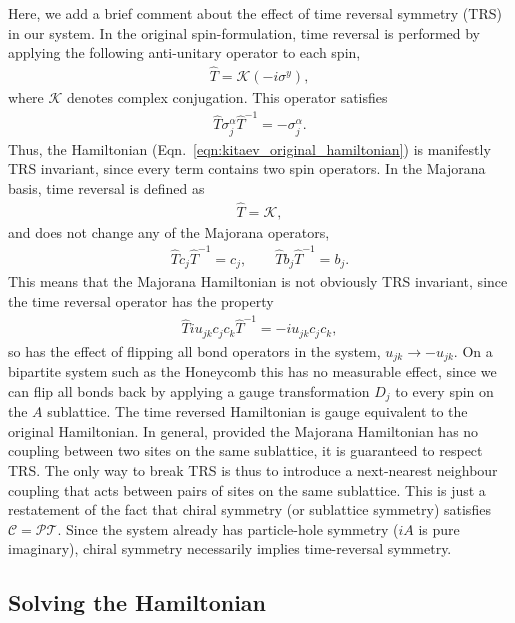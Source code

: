 Here, we add a brief comment about the effect of time reversal symmetry (TRS) in our system. In the original spin-formulation, time reversal is performed by applying the following anti-unitary operator to each spin,
\begin{align}
    \hat T = \mathcal K (-i\sigma^y), 
\end{align}
where $\mathcal K$ denotes complex conjugation. 
This operator satisfies
\begin{align}
    \hat T \sigma^\alpha_j \hat T^{-1} = - \sigma^\alpha_j.
\end{align}
Thus, the Hamiltonian (Eqn.~\ref{eqn:kitaev_original_hamiltonian}) is manifestly TRS invariant, since every term contains two spin operators. In the Majorana basis, time reversal is defined as
\begin{align}
    \hat T = \mathcal K,
\end{align}
and does not change any of the Majorana operators,
\begin{align}
    \hat T c_j \hat T^{-1} = c_j, \qquad \hat T b_j \hat T^{-1} = b_j.
\end{align}
This means that the Majorana Hamiltonian is not obviously TRS invariant, since the time reversal operator has the property
\begin{align}
    \hat T iu_{jk}c_jc_k \hat T^{-1} = -iu_{jk}c_jc_k,
\end{align}
so has the effect of flipping all bond operators in the system, $u_{jk} \rightarrow -u_{jk}$. On a bipartite system such as the Honeycomb this has no measurable effect, since we can flip all bonds back by applying a gauge transformation $D_j$ to every spin on the $A$ sublattice. The time reversed Hamiltonian is gauge equivalent to the original Hamiltonian. In general, provided the Majorana Hamiltonian has no coupling between two sites on the same sublattice, it is guaranteed to respect TRS. The only way to break TRS is thus to introduce a next-nearest neighbour coupling that acts between pairs of sites on the same sublattice. This is just a restatement of the fact that chiral symmetry (or sublattice symmetry) satisfies $\mathcal C = \mathcal P \mathcal T $. Since the system already has particle-hole symmetry ($iA$ is pure imaginary), chiral symmetry necessarily implies time-reversal symmetry. 

\subsection{Solving the Hamiltonian}

